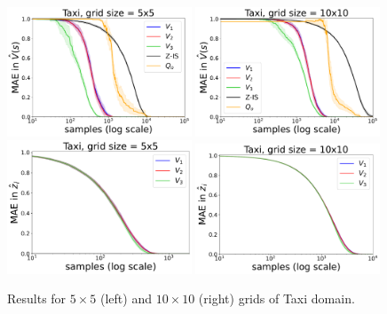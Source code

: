 \begin{figure}[!h]
\centering
\includegraphics[width=0.49\textwidth]{figures/chapter1/learning/taxi_5.png}
\includegraphics[width=0.49\textwidth]{figures/chapter1/learning/taxi_10.png}
\includegraphics[width=0.49\textwidth]{figures/chapter1/subtasks/taxi_5_subtasks.png}
\includegraphics[width=0.49\textwidth]{figures/chapter1/subtasks/taxi_10_subtasks.png}
\caption{Results for $5 \times 5$ (left) and $10 \times 10$ (right) grids of Taxi domain.}
\label{fig:hlmdps_errors_taxi}
\end{figure}


